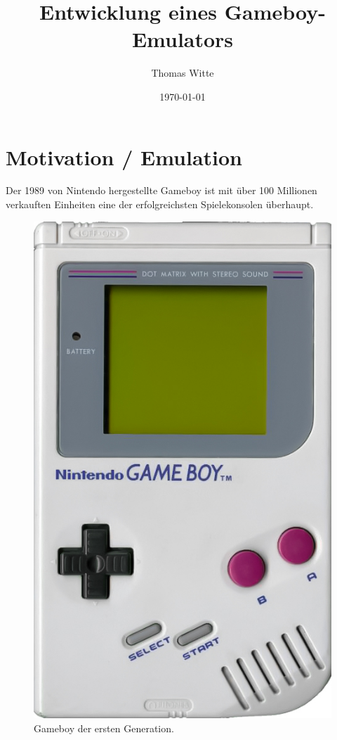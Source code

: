 \documentclass[a4paper]{scrartcl}
\title{Entwicklung eines Gameboy-Emulators}
\author{Thomas Witte}
\date{\today}
\begin{document}
\maketitle

\section{Motivation / Emulation}

Der 1989 von Nintendo hergestellte Gameboy ist mit über 100 Millionen verkauften Einheiten eine der erfolgreichsten Spielekonsolen überhaupt.

\begin{figure}
\centering
\includegraphics[width=0.9\linewidth]{img/Gameboy.jpg}
\caption{Gameboy der ersten Generation.}
\label{img:gameboy}
\end{figure}
\end{document}
